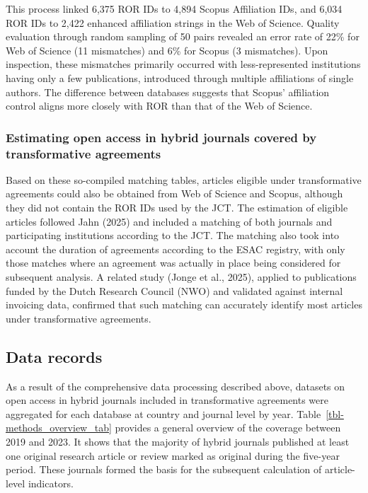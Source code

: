 \documentclass[a4paper,man,floatsintext,longtable,noextraspace,10pt]{apa6}
\begin{document}
This process linked 6,375 ROR IDs to 4,894 Scopus Affiliation IDs, and
6,034 ROR IDs to 2,422 enhanced affiliation strings in the Web of
Science. Quality evaluation through random sampling of 50 pairs revealed
an error rate of 22\% for Web of Science (11 mismatches) and 6\% for
Scopus (3 mismatches). Upon inspection, these mismatches primarily
occurred with less-represented institutions having only a few
publications, introduced through multiple affiliations of single
authors. The difference between databases suggests that Scopus'
affiliation control aligns more closely with ROR than that of the Web of
Science.

\subsubsection{Estimating open access in hybrid journals covered by
transformative
agreements}\label{estimating-open-access-in-hybrid-journals-covered-by-transformative-agreements}

Based on these so-compiled matching tables, articles eligible under
transformative agreements could also be obtained from Web of Science and
Scopus, although they did not contain the ROR IDs used by the JCT. The
estimation of eligible articles followed Jahn (2025) and included a
matching of both journals and participating institutions according to
the JCT. The matching also took into account the duration of agreements
according to the ESAC registry, with only those matches where an
agreement was actually in place being considered for subsequent
analysis. A related study (Jonge et al., 2025), applied to publications
funded by the Dutch Research Council (NWO) and validated against
internal invoicing data, confirmed that such matching can accurately
identify most articles under transformative agreements.

\subsection{Data records}\label{data-records}

As a result of the comprehensive data processing described above,
datasets on open access in hybrid journals included in transformative
agreements were aggregated for each database at country and journal
level by year. Table~\ref{tbl-methods_overview_tab} provides a general
overview of the coverage between 2019 and 2023. It shows that the
majority of hybrid journals published at least one original research
article or review marked as original during the five-year period. These
journals formed the basis for the subsequent calculation of
article-level indicators.
\end{document}
